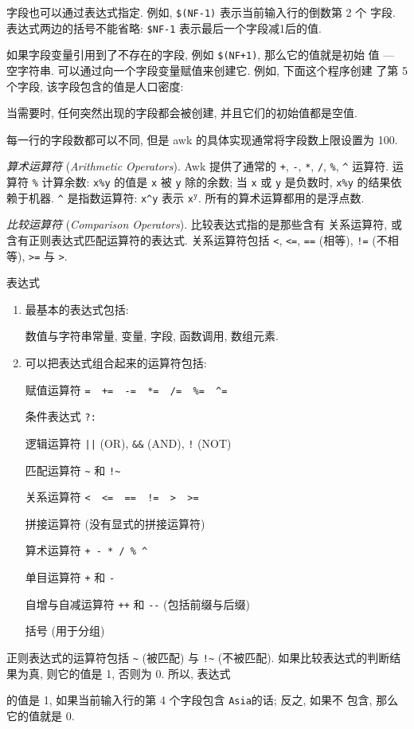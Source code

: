 字段也可以通过表达式指定. 例如, \verb'$(NF-1)' 表示当前输入行的倒数第 2 个
字段. 表达式两边的括号不能省略: \verb'$NF-1' 表示最后一个字段减1后的值.

如果字段变量引用到了不存在的字段, 例如 \verb'$(NF+1)', 那么它的值就是初始
值 --- 空字符串. 可以通过向一个字段变量赋值来创建它. 例如, 下面这个程序创建
了第 5 个字段, 该字段包含的值是人口密度:
当需要时, 任何突然出现的字段都会被创建, 并且它们的初始值都是空值.

每一行的字段数都可以不同, 但是 awk 的具体实现通常将字段数上限设置为 100.

\emph{算术运算符} (\emph{Arithmetic Operators}). Awk 提供了通常的 \verb'+',
\verb'-', \verb'*', \verb'/', \verb'%', \verb'^' 运算符. 运算符 \verb'%'
计算余数: \verb'x%y' 的值是 \verb'x' 被 \verb'y' 除的余数; 当 \verb'x' 或
\verb'y' 是负数时, \verb'x%y' 的结果依赖于机器. \verb'^' 是指数运算符:
\verb'x^y' 表示 \verb'x'$^\texttt{y}$. 所有的算术运算都用的是浮点数.

\emph{比较运算符} (\emph{Comparison Operators}). 比较表达式指的是那些含有
关系运算符, 或含有正则表达式匹配运算符的表达式. 关系运算符包括 \verb'<',
\verb'<=', \verb'==' (相等), \verb'!=' (不相等), \verb'>=' 与 \verb'>'.
\begin{summary}{表达式}
    \begin{enumerate}
        \item 最基本的表达式包括: \par
            数值与字符串常量, 变量, 字段, 函数调用, 数组元素.
        \item 可以把表达式组合起来的运算符包括: \par
            赋值运算符 \verb'=  +=  -=  *=  /=  %=  ^='
        \par 条件表达式 \verb'?:'
        \par 逻辑运算符 \verb'||' (OR), \verb'&&' (AND), \verb'!' (NOT)
        \par 匹配运算符 \verb'~' 和 \verb'!~'
        \par 关系运算符 \verb'<  <=  ==  !=  >  >='
        \par 拼接运算符 (没有显式的拼接运算符)
        \par 算术运算符 \verb'+ - * / % ^'
        \par 单目运算符 \verb'+' 和 \verb'-'
        \par 自增与自减运算符 \verb'++' 和 \verb'--' (包括前缀与后缀)
        \par 括号 (用于分组)
    \end{enumerate}
\end{summary}
正则表达式的运算符包括 \verb'~' (被匹配) 与 \verb'!~' (不被匹配).
如果比较表达式的判断结果为真, 则它的值是 1, 否则为 0. 所以, 表达式
的值是 1, 如果当前输入行的第 4 个字段包含 \verb'Asia'的话; 反之, 如果不
包含, 那么它的值就是 0.


